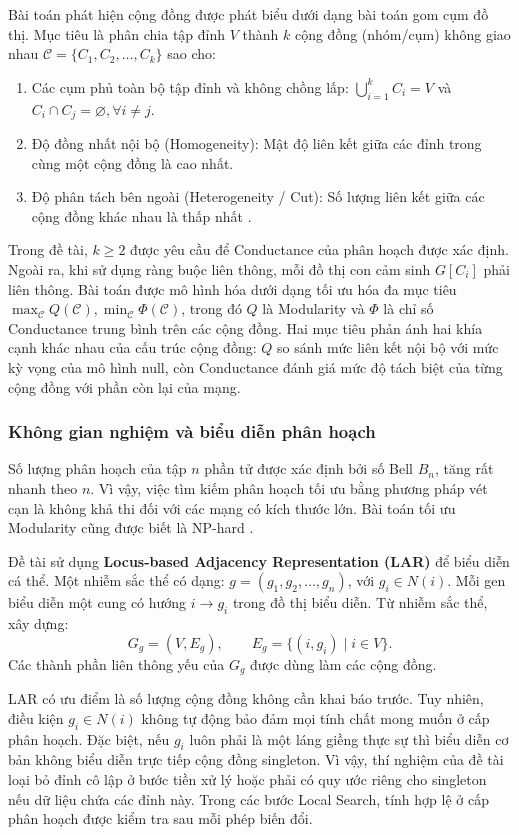 \documentclass[14pt,a4paper]{extarticle}
\begin{document}
Bài toán phát hiện cộng đồng được phát biểu dưới dạng bài toán gom cụm đồ thị. Mục tiêu là phân chia tập đỉnh $V$ thành $k$ cộng đồng (nhóm/cụm) không giao nhau $\mathcal{C} = \{C_1, C_2, \dots, C_k\}$ \cite{Taillard2023} sao cho:
\begin{enumerate}
    \item Các cụm phủ toàn bộ tập đỉnh và không chồng lấp: $\bigcup_{i=1}^{k} C_i = V$ và $C_i \cap C_j = \varnothing, \forall i \neq j$.
    \item Độ đồng nhất nội bộ (Homogeneity): Mật độ liên kết giữa các đỉnh trong cùng một cộng đồng là cao nhất.
    \item Độ phân tách bên ngoài (Heterogeneity / Cut): Số lượng liên kết giữa các cộng đồng khác nhau là thấp nhất \cite{Taillard2023}.
\end{enumerate}

Trong đề tài, $k\ge 2$ được yêu cầu để Conductance của phân hoạch được xác định. Ngoài ra, khi sử dụng ràng buộc liên thông, mỗi đồ thị con cảm sinh $G[C_i]$ phải liên thông.
Bài toán được mô hình hóa dưới dạng tối ưu hóa đa mục tiêu $\max_{\mathcal{C}} Q(\mathcal{C}), \min_{\mathcal{C}} \Phi(\mathcal{C})$, trong đó $Q$ là Modularity và $\Phi$ là chỉ số Conductance trung bình trên các cộng đồng. Hai mục tiêu phản ánh hai khía cạnh khác nhau của cấu trúc cộng đồng: $Q$ so sánh mức liên kết nội bộ với mức kỳ vọng của mô hình null, còn Conductance đánh giá mức độ tách biệt của từng cộng đồng với phần còn lại của mạng.

\subsubsection{Không gian nghiệm và biểu diễn phân hoạch}

Số lượng phân hoạch của tập $n$ phần tử được xác định bởi số Bell $B_n$, tăng rất nhanh theo $n$. Vì vậy, việc tìm kiếm phân hoạch tối ưu bằng phương pháp vét cạn là không khả thi đối với các mạng có kích thước lớn. Bài toán tối ưu Modularity cũng được biết là NP-hard \cite{Fortunato2010}.


Đề tài sử dụng \textbf{Locus-based Adjacency Representation (LAR)} để biểu diễn cá thể. Một nhiễm sắc thể có dạng:
$g=(g_1,g_2,\ldots,g_n)$, với $g_i\in N(i)$. Mỗi gen biểu diễn một cung có hướng $i\rightarrow g_i$ trong đồ thị biểu diễn. Từ nhiễm sắc thể, xây dựng:
\[
G_g=(V,E_g),\qquad
E_g=\{(i,g_i)\mid i\in V\}.
\]
Các thành phần liên thông yếu của $G_g$ được dùng làm các cộng đồng.

LAR có ưu điểm là số lượng cộng đồng không cần khai báo trước. Tuy nhiên, điều kiện $g_i\in N(i)$ không tự động bảo đảm mọi tính chất mong muốn ở cấp phân hoạch. Đặc biệt, nếu $g_i$ luôn phải là một láng giềng thực sự thì biểu diễn cơ bản không biểu diễn trực tiếp cộng đồng singleton. Vì vậy, thí nghiệm của đề tài loại bỏ đỉnh cô lập ở bước tiền xử lý hoặc phải có quy ước riêng cho singleton nếu dữ liệu chứa các đỉnh này. Trong các bước Local Search, tính hợp lệ ở cấp phân hoạch được kiểm tra sau mỗi phép biến đổi.
\end{document}
